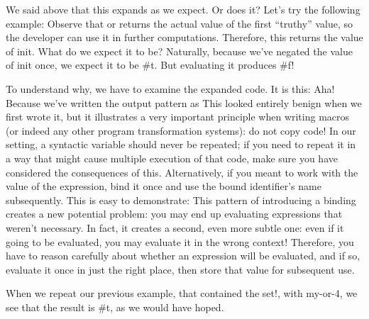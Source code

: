 
We said above that this expands as we expect. Or does it? Let’s try the
following example:
Observe that or returns the actual value of the first “truthy” value, so the
developer can use it in further computations. Therefore, this returns the value
of init. What do we expect it to be? Naturally, because we’ve negated the value
of init once, we expect it to be \#t. But evaluating it produces \#f!

To understand why, we have to examine the expanded code. It is this:
Aha! Because we’ve written the output pattern as
This looked entirely benign when we first wrote it, but it illustrates a very
important principle when writing macros (or indeed any other program
transformation systems): do not copy code! In our setting, a syntactic variable
should never be repeated; if you need to repeat it in a way that might cause
multiple execution of that code, make sure you have considered the consequences
of this. Alternatively, if you meant to work with the value of the expression,
bind it once and use the bound identifier’s name subsequently. This is easy to
demonstrate:
This pattern of introducing a binding creates a new potential problem: you may
end up evaluating expressions that weren’t necessary. In fact, it creates a
second, even more subtle one: even if it going to be evaluated, you may evaluate
it in the wrong context! Therefore, you have to reason carefully about whether
an expression will be evaluated, and if so, evaluate it once in just the right
place, then store that value for subsequent use.

When we repeat our previous example, that contained the set!, with my-or-4, we
see that the result is \#t, as we would have hoped.
